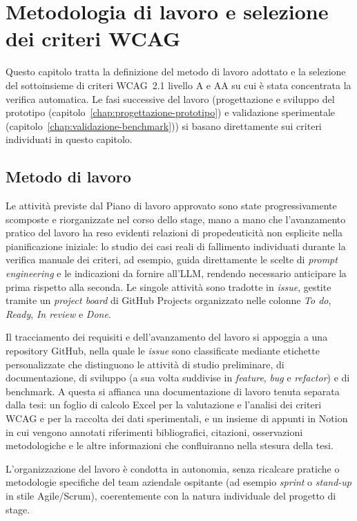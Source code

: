 \chapter{Metodologia di lavoro e selezione dei criteri WCAG}
\label{chap:metodologia-selezione}

Questo capitolo tratta la definizione del metodo di lavoro adottato e la selezione del sottoinsieme di criteri WCAG~2.1 livello A e AA su cui è stata concentrata la verifica automatica. Le fasi successive del lavoro (progettazione e sviluppo del prototipo (capitolo~\ref{chap:progettazione-prototipo}) e validazione sperimentale (capitolo~\ref{chap:validazione-benchmark})) si basano direttamente sui criteri individuati in questo capitolo.


\section{Metodo di lavoro}
\label{sec:metodo-lavoro}
 
Le attività previste dal Piano di lavoro approvato sono state progressivamente scomposte e riorganizzate nel corso dello stage, mano a mano che l'avanzamento pratico del lavoro ha reso evidenti relazioni di propedeuticità non esplicite nella pianificazione iniziale: lo studio dei casi reali di fallimento individuati durante la verifica manuale dei criteri, ad esempio, guida direttamente le scelte di \emph{prompt engineering} e le indicazioni da fornire all'LLM, rendendo necessario anticipare la prima rispetto alla seconda. Le singole attività sono tradotte in \emph{issue}, gestite tramite un \emph{project board} di GitHub Projects organizzato nelle colonne \emph{To do}, \emph{Ready}, \emph{In review} e \emph{Done}.
 
Il tracciamento dei requisiti e dell'avanzamento del lavoro si appoggia a una repository GitHub, nella quale le \emph{issue} sono classificate mediante etichette personalizzate che distinguono le attività di studio preliminare, di documentazione, di sviluppo (a sua volta suddivise in \emph{feature}, \emph{bug} e \emph{refactor}) e di benchmark. A questa si affianca una documentazione di lavoro tenuta separata dalla tesi: un foglio di calcolo Excel per la valutazione e l'analisi dei criteri WCAG e per la raccolta dei dati sperimentali, e un insieme di appunti in Notion in cui vengono annotati riferimenti bibliografici, citazioni, osservazioni metodologiche e le altre informazioni che confluiranno nella stesura della tesi.
 
L'organizzazione del lavoro è condotta in autonomia, senza ricalcare pratiche o metodologie specifiche del team aziendale ospitante (ad esempio \emph{sprint} o \emph{stand-up} in stile Agile/Scrum), coerentemente con la natura individuale del progetto di stage.
 
